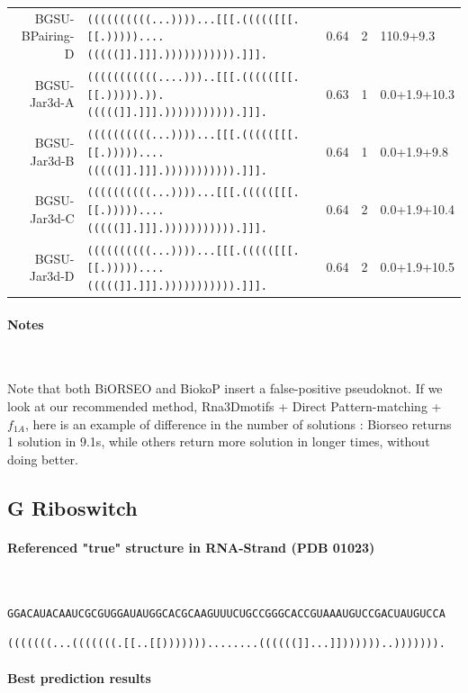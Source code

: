 \documentclass{article}
\begin{document}
{\begin{tabular}{rlccl}
BGSU-BPairing-D            &  \texttt{((((((((((...))))...[[[.((((([[[.[[.)))))....(((((]].]]].))))))))))).]]].} &      0.64  &  2    &   110.9+9.3\\
BGSU-Jar3d-A          &  \texttt{(((((((((((....)))..[[[.((((([[[.[[.))))).)).(((((]].]]].))))))))))).]]].} &      0.63  &  1    &   0.0+1.9+10.3\\
BGSU-Jar3d-B          &  \texttt{((((((((((...))))...[[[.((((([[[.[[.)))))....(((((]].]]].))))))))))).]]].} &      0.64  &  1     &  0.0+1.9+9.8\\
BGSU-Jar3d-C          &  \texttt{((((((((((...))))...[[[.((((([[[.[[.)))))....(((((]].]]].))))))))))).]]].} &      0.64  &  2    &   0.0+1.9+10.4\\
BGSU-Jar3d-D          &  \texttt{((((((((((...))))...[[[.((((([[[.[[.)))))....(((((]].]]].))))))))))).]]].} &      0.64  &  2    &   0.0+1.9+10.5\\
\end{tabular}}

\paragraph{Notes} ~

Note that both BiORSEO and BiokoP insert a false-positive pseudoknot. If we look at our recommended method, Rna3Dmotifs + Direct Pattern-matching  + $f_{1A}$, here is an example of difference in the number of solutions : Biorseo returns 1 solution in 9.1s, while others return more solution in longer times, without doing better.

\subsection{G Riboswitch}

\paragraph{Referenced "true" structure in RNA-Strand (PDB 01023)} ~ 

\texttt{GGACAUACAAUCGCGUGGAUAUGGCACGCAAGUUUCUGCCGGGCACCGUAAAUGUCCGACUAUGUCCA}

\texttt{(((((((...(((((((.[[..[[)))))))........((((((]]...]]))))))..))))))).}

\paragraph{Best prediction results} ~ 
\end{document}
